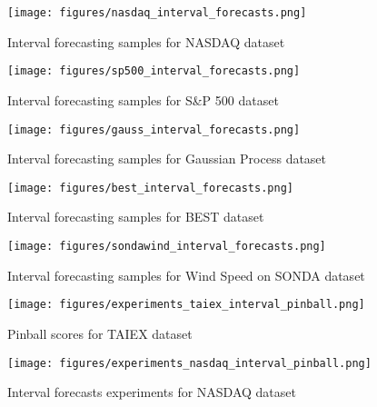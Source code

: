 \begin{figure}
\texttt{[image: figures/nasdaq\_interval\_forecasts.png]}
\caption{Interval forecasting samples for NASDAQ dataset}
\label{fig:nasdaq_interval_forecasts}
\end{figure}

\begin{figure}
\texttt{[image: figures/sp500\_interval\_forecasts.png]}
\caption{Interval forecasting samples for S\&P 500 dataset}
\label{fig:sp500_interval_forecasts}
\end{figure}

\begin{figure}
\texttt{[image: figures/gauss\_interval\_forecasts.png]}
\caption{Interval forecasting samples for Gaussian Process dataset}
\label{fig:gauss_interval_forecasts}
\end{figure}

\begin{figure}
\texttt{[image: figures/best\_interval\_forecasts.png]}
\caption{Interval forecasting samples for BEST dataset}
\label{fig:best_interval_forecasts}
\end{figure}


\begin{figure}
\texttt{[image: figures/sondawind\_interval\_forecasts.png]}
\caption{Interval forecasting samples for Wind Speed on SONDA dataset}
\label{fig:sondawind_interval_forecasts}
\end{figure}

\begin{figure}
\texttt{[image: figures/experiments\_taiex\_interval\_pinball.png]}
\caption{Pinball scores for TAIEX dataset}
\label{fig:experiments_taiex_interval_pinball}
\end{figure}

\begin{figure}
\texttt{[image: figures/experiments\_nasdaq\_interval\_pinball.png]}
\caption{Interval forecasts experiments for NASDAQ dataset}
\label{fig:experiments_nasdaq_interval_pinball}
\end{figure}

